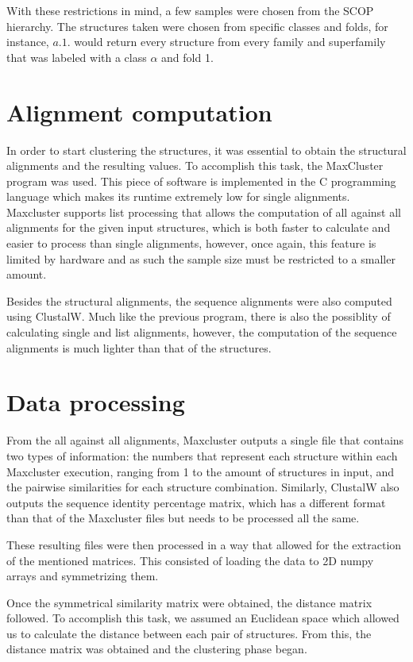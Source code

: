 With these restrictions in mind, a few samples were chosen from the SCOP hierarchy. The structures taken were chosen from specific classes and folds, for instance, $a.1.$ would return every structure from every family and superfamily that was labeled with a class $\alpha$ and fold 1. 

\section{Alignment computation}

In order to start clustering the structures, it was essential to obtain the structural alignments and the resulting values. To accomplish this task, the MaxCluster program was used. This piece of software is implemented in the C programming language which makes its runtime extremely low for single alignments. Maxcluster supports list processing that allows the computation of all against all alignments for the given input structures, which is both faster to calculate and easier to process than single alignments, however, once again, this feature is limited by hardware and as such the sample size must be restricted to a smaller amount.

Besides the structural alignments, the sequence alignments were also computed using ClustalW. Much like the previous program, there is also the possiblity of calculating single and list alignments, however, the computation of the sequence alignments is much lighter than that of the structures.

\section{Data processing} 

From the all against all alignments, Maxcluster outputs a single file that contains two types of information: the numbers that represent each structure within each Maxcluster execution, ranging from 1 to the amount of structures in input, and the pairwise similarities for each structure combination. Similarly, ClustalW also outputs the sequence identity percentage matrix, which has a different format than that of the Maxcluster files but needs to be processed all the same.

These resulting files were then processed in a way that allowed for the extraction of the mentioned matrices. This consisted of loading the data to 2D numpy arrays and symmetrizing them.

Once the symmetrical similarity matrix were obtained, the distance matrix followed. To accomplish this task, we assumed an Euclidean space which allowed us to calculate the distance between each pair of structures. From this, the distance matrix was obtained and the clustering phase began.

